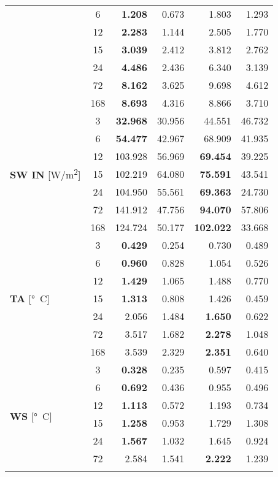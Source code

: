 \begin{tabular}{p{2.1cm}c|rr|rr}
{{{ & 6 & \bfseries 1.208 & 0.673 & 1.803 & 1.293 \\
 & 12 & \bfseries 2.283 & 1.144 & 2.505 & 1.770 \\
 & 15 & \bfseries 3.039 & 2.412 & 3.812 & 2.762 \\
 & 24 & \bfseries 4.486 & 2.436 & 6.340 & 3.139 \\
 & 72 & \bfseries 8.162 & 3.625 & 9.698 & 4.612 \\
 & 168 & \bfseries 8.693 & 4.316 & 8.866 & 3.710 \\
\cline{1-6}
\multirow[c]{7}{*}{\parbox{2.1cm}{\textbf{SW IN} [\si{W/m^2}]}} & 3 & \bfseries 32.968 & 30.956 & 44.551 & 46.732 \\
 & 6 & \bfseries 54.477 & 42.967 & 68.909 & 41.935 \\
 & 12 & 103.928 & 56.969 & \bfseries 69.454 & 39.225 \\
 & 15 & 102.219 & 64.080 & \bfseries 75.591 & 43.541 \\
 & 24 & 104.950 & 55.561 & \bfseries 69.363 & 24.730 \\
 & 72 & 141.912 & 47.756 & \bfseries 94.070 & 57.806 \\
 & 168 & 124.724 & 50.177 & \bfseries 102.022 & 33.668 \\
\cline{1-6}
\multirow[c]{7}{*}{\parbox{2.1cm}{\textbf{TA} [\si{°C}]}} & 3 & \bfseries 0.429 & 0.254 & 0.730 & 0.489 \\
 & 6 & \bfseries 0.960 & 0.828 & 1.054 & 0.526 \\
 & 12 & \bfseries 1.429 & 1.065 & 1.488 & 0.770 \\
 & 15 & \bfseries 1.313 & 0.808 & 1.426 & 0.459 \\
 & 24 & 2.056 & 1.484 & \bfseries 1.650 & 0.622 \\
 & 72 & 3.517 & 1.682 & \bfseries 2.278 & 1.048 \\
 & 168 & 3.539 & 2.329 & \bfseries 2.351 & 0.640 \\
\cline{1-6}
\multirow[c]{7}{*}{\parbox{2.1cm}{\textbf{WS} [\si{°C}]}} & 3 & \bfseries 0.328 & 0.235 & 0.597 & 0.415 \\
 & 6 & \bfseries 0.692 & 0.436 & 0.955 & 0.496 \\
 & 12 & \bfseries 1.113 & 0.572 & 1.193 & 0.734 \\
 & 15 & \bfseries 1.258 & 0.953 & 1.729 & 1.308 \\
 & 24 & \bfseries 1.567 & 1.032 & 1.645 & 0.924 \\
 & 72 & 2.584 & 1.541 & \bfseries 2.222 & 1.239 \\
}}}
\end{tabular}
